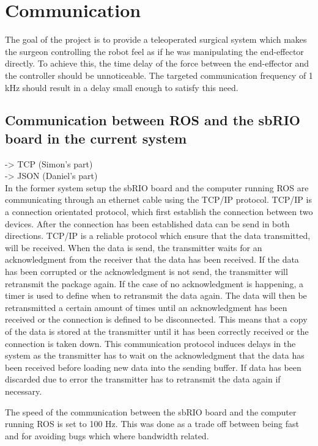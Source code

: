\chapter{Communication}\label{cha:communication}

The goal of the project is to provide a teleoperated surgical system which makes the surgeon controlling the robot feel as if he was manipulating the end-effector directly. To achieve this, the time delay of the force between the end-effector and the controller should be unnoticeable. The targeted communication frequency of 1 kHz should result in a delay small enough to satisfy this need.

\section{Communication between ROS and the sbRIO board in the current system}

-> TCP		(Simon's part)\\
-> JSON		(Daniel's part)\\

In the former system setup the sbRIO board and the computer running ROS are communicating through an ethernet cable using the TCP/IP protocol. TCP/IP is a connection orientated protocol, which first establish the connection between two devices. After the connection has been established data can be send in both directions. TCP/IP is a reliable protocol which ensure that the data transmitted, will be received. When the data is send, the transmitter waits for an acknowledgment from the receiver that the data has been received. If the data has been corrupted or the acknowledgment is not send, the transmitter will retransmit the package again. If the case of no acknowledgment is happening, a timer is used to define when to retransmit the data again. The data will then be retransmitted a certain amount of times until an acknowledgment has been received or the connection is defined to be disconnected. This means that a copy of the data is stored at the transmitter until it has been correctly received or the connection is taken down.
This communication protocol induces delays in the system as the transmitter has to wait on the acknowledgment that the data has been received before loading new data into the sending buffer. If data has been discarded due to error the transmitter has to retransmit the data again if necessary.  

The speed of the communication between the sbRIO board and the computer running ROS is set to 100 Hz. This was done as a trade off between being fast and for avoiding bugs which where bandwidth related\cite{Chris_Surgical}.



